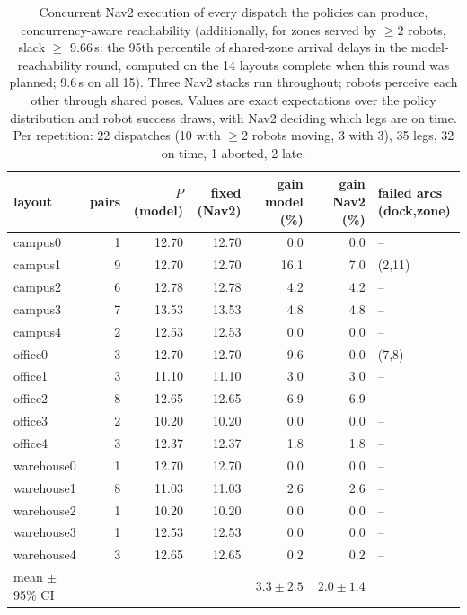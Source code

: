 \begin{table}[h]\centering\caption{Concurrent Nav2 execution of every dispatch the policies can produce, concurrency-aware reachability (additionally, for zones served by $\ge2$ robots, slack $\ge$ 9.66\,s: the 95th percentile of shared-zone arrival delays in the model-reachability round, computed on the 14 layouts complete when this round was planned; 9.6\,s on all 15). Three Nav2 stacks run throughout; robots perceive each other through shared poses. Values are exact expectations over the policy distribution and robot success draws, with Nav2 deciding which legs are on time. Per repetition: 22 dispatches (10 with $\ge$2 robots moving, 3 with 3), 35 legs, 32 on time, 1 aborted, 2 late.}\label{tab:s-exact-verified2}\scriptsize
\begin{tabular}{@{}lrrrrrl@{}}\toprule layout & pairs & $P$ (model) & fixed (Nav2) & gain model (\%) & gain Nav2 (\%) & failed arcs (dock,zone)\\\midrule
campus0 & 1 & 12.70 & 12.70 & 0.0 & 0.0 & --\\
campus1 & 9 & 12.70 & 12.70 & 16.1 & 7.0 & (2,11)\\
campus2 & 6 & 12.78 & 12.78 & 4.2 & 4.2 & --\\
campus3 & 7 & 13.53 & 13.53 & 4.8 & 4.8 & --\\
campus4 & 2 & 12.53 & 12.53 & 0.0 & 0.0 & --\\
office0 & 3 & 12.70 & 12.70 & 9.6 & 0.0 & (7,8)\\
office1 & 3 & 11.10 & 11.10 & 3.0 & 3.0 & --\\
office2 & 8 & 12.65 & 12.65 & 6.9 & 6.9 & --\\
office3 & 2 & 10.20 & 10.20 & 0.0 & 0.0 & --\\
office4 & 3 & 12.37 & 12.37 & 1.8 & 1.8 & --\\
warehouse0 & 1 & 12.70 & 12.70 & 0.0 & 0.0 & --\\
warehouse1 & 8 & 11.03 & 11.03 & 2.6 & 2.6 & --\\
warehouse2 & 1 & 10.20 & 10.20 & 0.0 & 0.0 & --\\
warehouse3 & 1 & 12.53 & 12.53 & 0.0 & 0.0 & --\\
warehouse4 & 3 & 12.65 & 12.65 & 0.2 & 0.2 & --\\
\midrule mean $\pm$ 95\% CI & & & & $3.3\pm2.5$ & $2.0\pm1.4$ & \\
\bottomrule\end{tabular}\end{table}